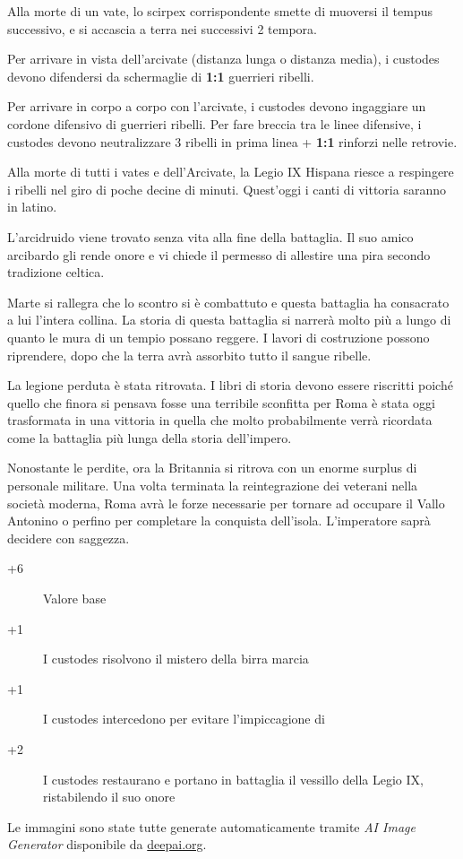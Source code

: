 \documentclass[11.5pt,twocolumn]{article}
\newcommand\geordie{Georgius Mar Mathan}
\begin{document}
Alla morte di un vate, lo scirpex corrispondente smette di muoversi il tempus successivo, e si accascia a terra nei successivi 2 tempora.

Per arrivare in vista dell'arcivate (distanza lunga o distanza media), i custodes devono difendersi da schermaglie di \textbf{1:1} guerrieri ribelli.

Per arrivare in corpo a corpo con l'arcivate, i custodes devono ingaggiare un cordone difensivo di guerrieri ribelli. Per fare breccia tra le linee difensive, i custodes devono neutralizzare 3 ribelli in prima linea + \textbf{1:1} rinforzi nelle retrovie.

Alla morte di tutti i vates e dell'Arcivate, la Legio IX Hispana riesce a respingere i ribelli nel giro di poche decine di minuti.
Quest'oggi i canti di vittoria saranno in latino.

%
L'arcidruido viene trovato senza vita alla fine della battaglia.
Il suo amico arcibardo gli rende onore e vi chiede il permesso di allestire una pira secondo tradizione celtica.

Marte si rallegra che lo scontro si \`{e} combattuto e questa battaglia ha consacrato a lui l'intera collina.
La storia di questa battaglia si narrer\`{a} molto pi\`{u} a lungo di quanto le mura di un tempio possano reggere.
I lavori di costruzione possono riprendere, dopo che la terra avr\`{a} assorbito tutto il sangue ribelle.

La legione perduta \`{e} stata ritrovata.
I libri di storia devono essere riscritti poich\'{e} quello che finora si pensava fosse una terribile sconfitta per Roma \`{e} stata oggi trasformata in una vittoria in quella che molto probabilmente verr\`{a} ricordata come la battaglia pi\`{u} lunga della storia dell'impero.

Nonostante le perdite, ora la Britannia si ritrova con un enorme surplus di personale militare.
Una volta terminata la reintegrazione dei veterani nella societ\`{a} moderna, Roma avr\`{a} le forze necessarie per tornare ad occupare il Vallo Antonino o perfino per completare la conquista dell'isola.
L'imperatore sapr\`{a} decidere con saggezza.

\begin{description}
\item[+6] Valore base
\item[+1] I custodes risolvono il mistero della birra marcia
\item[+1] I custodes intercedono per evitare l'impiccagione di \npcref{\geordie}
\item[+2] I custodes restaurano e portano in battaglia il vessillo della Legio IX, ristabilendo il suo onore
\end{description}

Le immagini sono state tutte generate automaticamente tramite \emph{AI Image Generator} disponibile da \url{deepai.org}.



\end{document}
